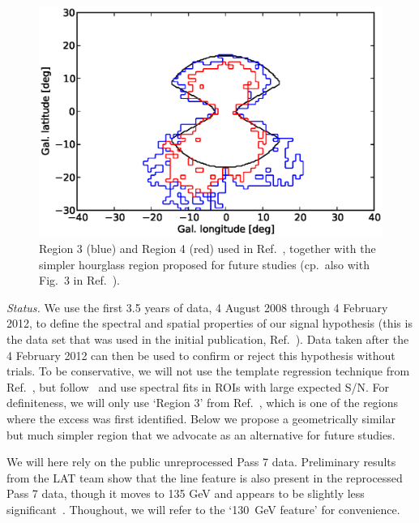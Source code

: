 \documentclass[aps,prd,superscriptaddress,nofootinbib,fixlfloat, 12pt]{revtex4-1}
\begin{document}
\begin{figure}[h]
  \begin{center}
    \includegraphics[width=0.6\linewidth]{plots/regions.eps}
    \vspace{-0.5cm}
  \end{center}
  \caption{Region 3 (blue) and Region 4 (red) used in
  Ref.~\cite{Weniger:2012}, together with the simpler hourglass region
  proposed for future studies (cp.~also with Fig.~3 in
  Ref.~\cite{Bringmann:2012ez}).}
  \label{fig:regions}
\end{figure}

\emph{Status.} 
We use the first 3.5 years of data, 4 August 2008 through 4 February 2012, to
define the spectral and spatial properties of our signal hypothesis (this is
the data set that was used in the initial publication,
Ref.~\cite{Bringmann:2012}). Data taken after the 4 February 2012 can then be
used to confirm or reject this hypothesis without trials. To be conservative,
we will not use the template regression technique from Ref.~\cite{linepaper},
but follow~\cite{Bringmann:2012, Weniger:2012} and use spectral fits in ROIs
with large expected S/N.  For definiteness, we will only use `Region 3' from
Ref.~\cite{Weniger:2012}, which is one of the regions where the excess was
first identified. Below we
propose a geometrically similar but much simpler region that we advocate as an
alternative for future studies.

We will here rely on the public unreprocessed Pass 7 data. Preliminary results
from the LAT team show that the line feature is also present in the
reprocessed Pass 7 data, though it moves to 135 GeV and appears to be slightly
less significant~\cite{Albert:Talk}. Thoughout, we will refer to the `130~GeV
feature' for convenience.
\end{document}
